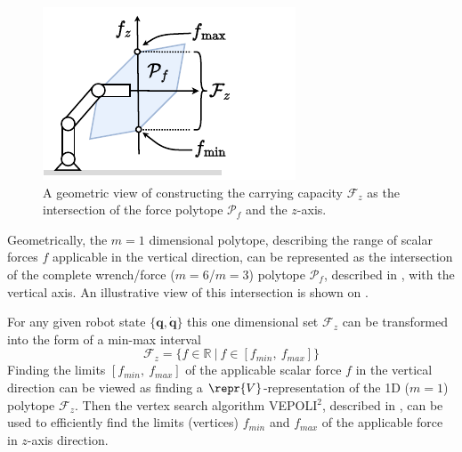 \begin{figure}
    \centering
    \includegraphics[width=\linewidth]{Papers/images/carrying_capacity_robot.pdf}
    \caption{A geometric view of constructing the carrying capacity $\mathcal{F}_z$ as the intersection of the force polytope $\mathcal{P}_f$ and the $z$-axis.}
    \label{fig:carrying_cap_robot}
\end{figure}

Geometrically, the $m=1$ dimensional polytope, describing the range of scalar forces $f$ applicable in the vertical direction, can be represented as the intersection of the complete wrench/force ($m=6$/$m=3$) polytope $\mathcal{P}_f$, described in , with the vertical axis. An illustrative view of this intersection is shown on .

For any given robot state $\{\bm{q},\dot{\bm{q}}\}$ this one dimensional set $\mathcal{F}_z$ can be transformed into the form of a min-max interval
\begin{equation}
    \mathcal{F}_z = \{ f \in \mathbb{R} ~|~ f \in[{f}_{min}, ~{f}_{max}]\}
\end{equation}
Finding the limits $[f_{min},~f_{max}]$ of the applicable scalar force $f$ in the vertical direction can be viewed as finding a $\repr{V}$-representation of the 1D ($m=1$) polytope $\mathcal{F}_z$. Then the vertex search algorithm VEPOLI$^2$, described in , can be used to efficiently find the limits (vertices) $f_{min}$ and $f_{max}$ of the applicable force in $z$-axis direction.  

